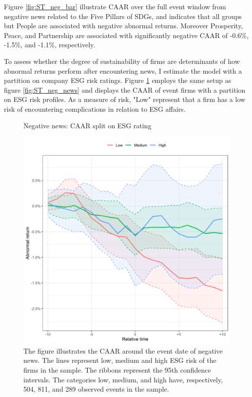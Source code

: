 Figure \ref{fig:ST_neg_bar} illustrate CAAR over the full event window from negative news related to the Five Pillars of SDGs, and indicates that all groups but People are associated with negative abnormal returns. Moreover Prosperity, Peace, and Partnership are associated with significantly negative CAAR of -0.6\%, -1.5\%, and -1.1\%, respectively.       

To assess whether the degree of sustainability of firms are determinants of how abnormal returns perform after encountering news, I estimate the model with a partition on company ESG risk ratings. Figure \ref{fig:ST_neg_ESG} employs the same setup as figure \ref{fig:ST_neg_news} and displays the CAAR of event firms with a partition on ESG risk profiles. As a measure of risk, "Low" represent that a firm has a low risk of encountering complications in relation to ESG affairs.

\begin{figure} [H]
    \centering
    \caption{Negative news: CAAR split on ESG rating}
    \includegraphics[scale=0.6]{Projekt/1.Figures analysis/ST_negative_ESG.png}
     \caption*{\footnotesize The figure illustrates the CAAR around the event date of negative news. The lines represent low, medium and high ESG risk of the firms in the sample. The ribbons represent the 95th confidence intervals. The categories low, medium, and high have, respectively, 504, 811, and 289 observed events in the sample. }
    \label{fig:ST_neg_ESG}
\end{figure} 


